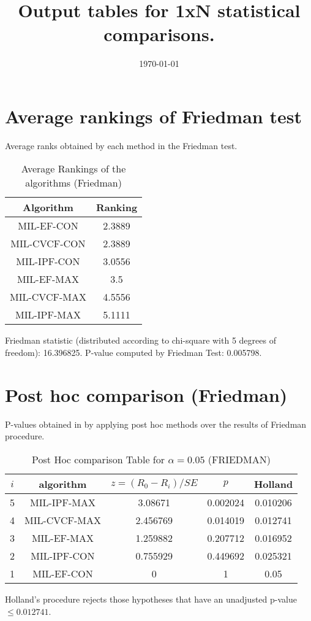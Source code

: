 \documentclass[a4paper,10pt]{article}
\title{Output tables for 1xN statistical comparisons.}
\author{}
\date{\today}
\begin{document}
\begin{landscape}
\pagestyle{empty}
\maketitle
\thispagestyle{empty}

\section{Average rankings of Friedman test}


Average ranks obtained by each method in the Friedman test.

\begin{table}[!htp]
\centering
\begin{tabular}{|c|c|}\hline
Algorithm&Ranking\\\hline
MIL-EF-CON&2.3889\\MIL-CVCF-CON&2.3889\\MIL-IPF-CON&3.0556\\MIL-EF-MAX&3.5\\MIL-CVCF-MAX&4.5556\\MIL-IPF-MAX&5.1111\\\hline\end{tabular}
\caption{Average Rankings of the algorithms (Friedman)}
\end{table}

Friedman statistic (distributed according to chi-square with 5 degrees of freedom): 16.396825. \newline P-value computed by Friedman Test: 0.005798.\newline


\newpage

\section{Post hoc comparison (Friedman)}


P-values obtained in by applying post hoc methods over the results of Friedman procedure.

\begin{table}[!htp]
\centering\footnotesize
\begin{tabular}{ccccc}
$i$&algorithm&$z=(R_0 - R_i)/SE$&$p$&Holland\\
\hline5&MIL-IPF-MAX&3.08671&0.002024&0.010206\\4&MIL-CVCF-MAX&2.456769&0.014019&0.012741\\3&MIL-EF-MAX&1.259882&0.207712&0.016952\\2&MIL-IPF-CON&0.755929&0.449692&0.025321\\1&MIL-EF-CON&0&1&0.05\\\hline
\end{tabular}
\caption{Post Hoc comparison Table for $\alpha=0.05$ (FRIEDMAN)}
\end{table}Holland's procedure rejects those hypotheses that have an unadjusted p-value $\le0.012741$.



\end{landscape}
\end{document}
